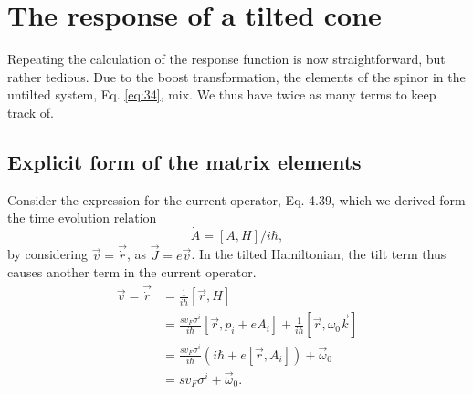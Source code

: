 \section{The response of a tilted cone}

Repeating the calculation of the response function is now straightforward, but rather tedious.
Due to the boost transformation, the elements of the spinor in the untilted system, Eq. \eqref{eq:34}, mix.
We thus have twice as many terms to keep track of.
\subsection{Explicit form of the matrix elements}

Consider the expression for the current operator, Eq. 4.39, which we derived form the time evolution relation
\[
  \dot{A} = [A, H]/i\hbar,
\]
by considering \(\vec{v} = \vec\dot{r}\), as \(\vec{J} = e \vec{v}\).
In the tilted Hamiltonian, the tilt term thus causes another term in the current operator.
\begin{equation}
  \label{eq:75}
  \begin{split}
    \vec{v} = \vec\dot{r} &= \frac{1}{i \hbar } [\vec{r}, H] \\
    &= \frac{s v_{F} \sigma ^{ i}}{i \hbar } [\vec{r}, p_{i} + e A_{i}] + \frac{1}{i\hbar } [\vec{r}, \omega_{0} \vec{k}]\\
    &= \frac{s v_{F} \sigma ^{ i}}{i \hbar } (i\hbar + e[\vec{r}, A_{i}]) + \vec{\omega}_{0}\\
    &= s v_{F} \sigma ^{i} + \vec{\omega} _{0}.
  \end{split}
\end{equation}

